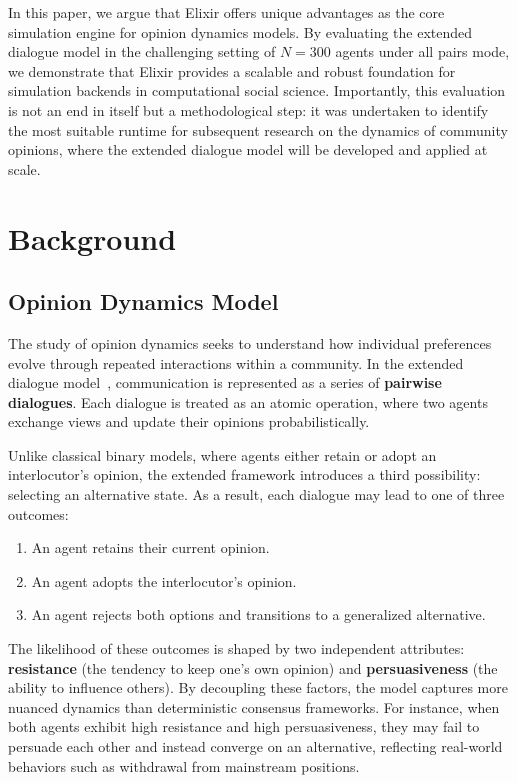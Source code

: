 \documentclass[
]{ceurart}
\begin{document}
In this paper, we argue that Elixir offers unique advantages as the core simulation engine for opinion dynamics models. By evaluating the extended dialogue model in the challenging setting of $N = 300$ agents under all pairs mode, we demonstrate that Elixir provides a scalable and robust foundation for simulation backends in computational social science. Importantly, this evaluation is not an end in itself but a methodological step: it was undertaken to identify the most suitable runtime for subsequent research on the dynamics of community opinions, where the extended dialogue model will be developed and applied at scale.

\section{Background}\label{sec:background}
\subsection{Opinion Dynamics Model}
The study of opinion dynamics seeks to understand how individual preferences evolve through repeated interactions within a community. In the extended dialogue model~\cite{Lytvynenko2025}, communication is represented as a series of \textbf{pairwise dialogues}. Each dialogue is treated as an atomic operation, where two agents exchange views and update their opinions probabilistically.

Unlike classical binary models, where agents either retain or adopt an interlocutor’s opinion, the extended framework introduces a third possibility: selecting an alternative state. As a result, each dialogue may lead to one of three outcomes:
\begin{enumerate}
	\item An agent retains their current opinion.
	\item An agent adopts the interlocutor’s opinion.
	\item An agent rejects both options and transitions to a generalized alternative.
\end{enumerate}
The likelihood of these outcomes is shaped by two independent attributes: \textbf{resistance} (the tendency to keep one’s own opinion) and \textbf{persuasiveness} (the ability to influence others). By decoupling these factors, the model captures more nuanced dynamics than deterministic consensus frameworks. For instance, when both agents exhibit high resistance and high persuasiveness, they may fail to persuade each other and instead converge on an alternative, reflecting real-world behaviors such as withdrawal from mainstream positions.
\end{document}
